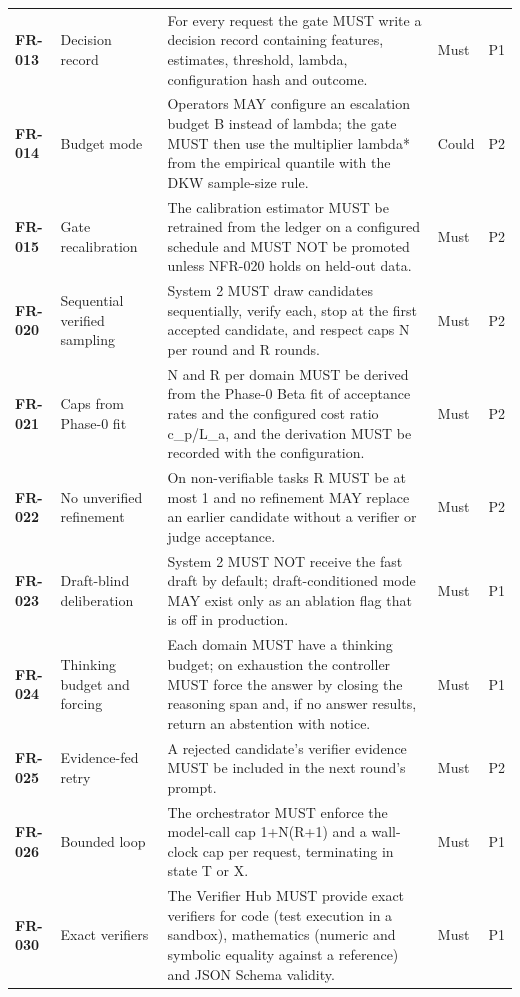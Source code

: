 \begin{longtable}{@{}p{1.45cm}p{2.5cm}p{8.1cm}p{1.6cm}p{1.1cm}@{}}
\textbf{FR-013} & Decision record & For every request the gate MUST write a decision record containing features, estimates, threshold, lambda, configuration hash and outcome. & Must & P1\\
\textbf{FR-014} & Budget mode & Operators MAY configure an escalation budget B instead of lambda; the gate MUST then use the multiplier lambda* from the empirical quantile with the DKW sample-size rule. & Could & P2\\
\textbf{FR-015} & Gate recalibration & The calibration estimator MUST be retrained from the ledger on a configured schedule and MUST NOT be promoted unless NFR-020 holds on held-out data. & Must & P2\\
\textbf{FR-020} & Sequential verified sampling & System 2 MUST draw candidates sequentially, verify each, stop at the first accepted candidate, and respect caps N per round and R rounds. & Must & P2\\
\textbf{FR-021} & Caps from Phase-0 fit & N and R per domain MUST be derived from the Phase-0 Beta fit of acceptance rates and the configured cost ratio c\_p/L\_a, and the derivation MUST be recorded with the configuration. & Must & P2\\
\textbf{FR-022} & No unverified refinement & On non-verifiable tasks R MUST be at most 1 and no refinement MAY replace an earlier candidate without a verifier or judge acceptance. & Must & P2\\
\textbf{FR-023} & Draft-blind deliberation & System 2 MUST NOT receive the fast draft by default; draft-conditioned mode MAY exist only as an ablation flag that is off in production. & Must & P1\\
\textbf{FR-024} & Thinking budget and forcing & Each domain MUST have a thinking budget; on exhaustion the controller MUST force the answer by closing the reasoning span and, if no answer results, return an abstention with notice. & Must & P1\\
\textbf{FR-025} & Evidence-fed retry & A rejected candidate's verifier evidence MUST be included in the next round's prompt. & Must & P2\\
\textbf{FR-026} & Bounded loop & The orchestrator MUST enforce the model-call cap 1+N(R+1) and a wall-clock cap per request, terminating in state T or X. & Must & P1\\
\textbf{FR-030} & Exact verifiers & The Verifier Hub MUST provide exact verifiers for code (test execution in a sandbox), mathematics (numeric and symbolic equality against a reference) and JSON Schema validity. & Must & P1\\

\end{longtable}
